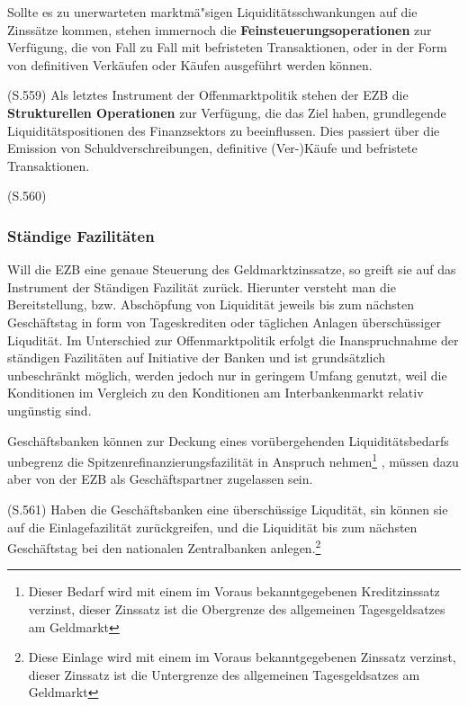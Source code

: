 \documentclass[
    onecolumn,
    a4paper,
    abstracton,
    parskip=half
    ,final
    ]{scrartcl}
\begin{document}
Sollte es zu unerwarteten marktm{\"a}{"s}igen Liquidit{\"a}tsschwankungen auf die Zinss{\"a}tze kommen, stehen immernoch die \textbf{Feinsteuerungsoperationen} zur Verf{\"u}gung, die von Fall zu Fall mit befristeten Transaktionen, oder in der Form von definitiven Verk{\"a}ufen oder K{\"a}ufen ausgef{\"u}hrt werden k{\"o}nnen.

(S.559)
Als letztes Instrument der Offenmarktpolitik stehen der EZB die \textbf{Strukturellen Operationen} zur Verf{\"u}gung, die das Ziel haben, grundlegende Liquidit{\"a}tspositionen des Finanzsektors zu beeinflussen. Dies passiert {\"u}ber die Emission von Schuldverschreibungen, definitive (Ver-)K{\"a}ufe und befristete Transaktionen.

(S.560)

\subsubsection{St{\"a}ndige Fazilit{\"a}ten}

Will die EZB eine genaue Steuerung des Geldmarktzinssatze, so greift sie auf das Instrument der St{\"a}ndigen Fazilit{\"a}t zur{\"u}ck. Hierunter versteht man die Bereitstellung, bzw. Absch{\"o}pfung von Liquidit{\"a}t jeweils bis zum n{\"a}chsten Gesch{\"a}ftstag in form von Tageskrediten oder t{\"a}glichen Anlagen {\"u}bersch{\"u}ssiger Liqudit{\"a}t. Im Unterschied zur Offenmarktpolitik erfolgt die Inanspruchnahme der st{\"a}ndigen Fazilit{\"a}ten auf Initiative der Banken und ist grunds{\"a}tzlich unbeschr{\"a}nkt m{\"o}glich, werden jedoch nur in geringem Umfang genutzt, weil die Konditionen im Vergleich zu den Konditionen am Interbankenmarkt relativ ung{\"u}nstig sind.

Gesch{\"a}ftsbanken k{\"o}nnen zur Deckung eines vor{\"u}bergehenden Liquidit{\"a}tsbedarfs unbegrenz die Spitzenrefinanzierungsfazilit{\"a}t in Anspruch nehmen\footnote[36]{Dieser Bedarf wird mit einem im Voraus bekanntgegebenen Kreditzinssatz verzinst, dieser Zinssatz ist die Obergrenze des allgemeinen Tagesgeldsatzes am Geldmarkt}
, m{\"u}ssen dazu aber von der EZB als Gesch{\"a}ftspartner zugelassen sein.

(S.561)
Haben die Gesch{\"a}ftsbanken eine {\"u}bersch{\"u}ssige Liqudit{\"a}t, sin k{\"o}nnen sie auf die Einlagefazilit{\"a}t zur{\"u}ckgreifen, und die Liquidit{\"a}t bis zum n{\"a}chsten Gesch{\"a}ftstag bei den nationalen Zentralbanken anlegen.\footnote[37]{Diese Einlage wird mit einem im Voraus bekanntgegebenen Zinssatz verzinst, dieser Zinssatz ist die Untergrenze des allgemeinen Tagesgeldsatzes am Geldmarkt}
\end{document}
